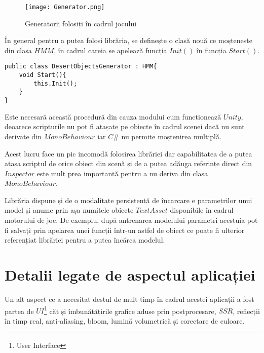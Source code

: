 \vspace{10mm}
\begin{figure}[H]
\centering
\texttt{[image: Generator.png]} \par
\caption{Generatorii folosiți în cadrul jocului}
\end{figure}

În general pentru a putea folosi librăria, se definește o clasă nouă ce moștenește din clasa $HMM$, în cadrul careia se apelează funcția $Init()$ în funcția $Start()$.\par

\begin{lstlisting}[caption=Exemplu de folosire a librăriei]
public class DesertObjectsGenerator : HMM{
    void Start(){
        this.Init();
    }
}
\end{lstlisting}

Este necesară această procedură din cauza modului cum functionează $Unity$, deoarece scripturile nu pot fi atașate pe obiecte în cadrul scenei dacă nu sunt derivate din $MonoBehaviour$ iar $C\#$ nu permite moștenirea multiplă.\par

Acest lucru face un pic incomodă folosirea librăriei dar capabilitatea de a putea atașa scriptul de orice obiect din scenă și de a putea adăuga referințe direct din $Inspector$ este mult prea importantă pentru a nu deriva din clasa $MonoBehaviour$.\par

Librăria dispune și de o modalitate persistentă de încarcare e parametrilor unui model și anume prin așa numitele obiecte $TextAsset$ disponibile în cadrul motorului de joc. De exemplu, după antrenarea modelului parametri acestuia pot fi salvați prin apelarea unei funcții într-un astfel de obiect ce poate fi ulterior referențiat librăriei pentru a putea încărca modelul.\par

\section{Detalii legate de aspectul aplicației}

Un alt aspect ce a necesitat destul de mult timp în cadrul acestei aplicații a fost partea de $UI$\footnote{User Interface} căt și îmbunătățirile grafice aduse prin postprocesare, $SSR$, reflecții în timp real, anti-aliasing, bloom, lumină volumetrică și corectare de culoare.\par


